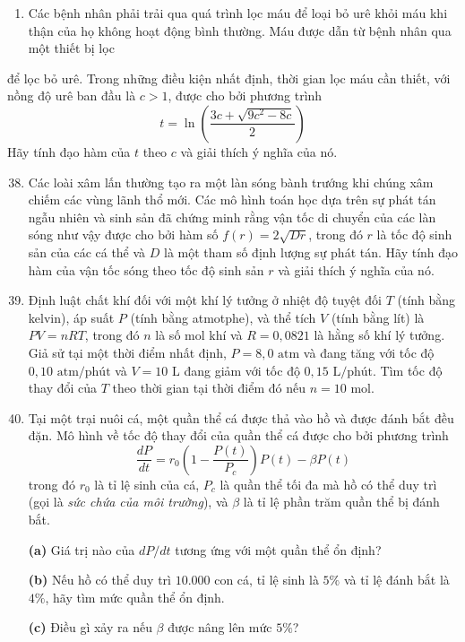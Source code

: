 \begin{minipage}[t]{0.485\textwidth}
\begin{enumerate}[label=\textbf{\arabic*.},leftmargin=1.6em,labelsep=0.4em,itemsep=6pt,topsep=5pt,parsep=1.5pt]
  \item Các bệnh nhân phải trải qua quá trình lọc máu để loại bỏ urê khỏi máu khi thận của họ không hoạt động bình thường. Máu được dẫn từ bệnh nhân qua một thiết bị lọc
\end{enumerate}
\end{minipage}%
\hfill
\begin{minipage}[t]{0.485\textwidth}
\vspace{0pt}
\noindent
để lọc bỏ urê. Trong những điều kiện nhất định, thời gian lọc máu cần thiết, với nồng độ urê ban đầu là $c > 1$, được cho bởi phương trình
\[
t = \ln\left( \frac{3c + \sqrt{9c^2 - 8c}}{2} \right)
\]
Hãy tính đạo hàm của $t$ theo $c$ và giải thích ý nghĩa của nó.

\begin{enumerate}[label=\textbf{\arabic*.},leftmargin=1.6em,labelsep=0.4em,itemsep=6pt,topsep=5pt,parsep=1.5pt]
\setcounter{enumi}{37}
  \item Các loài xâm lấn thường tạo ra một làn sóng bành trướng khi chúng xâm chiếm các vùng lãnh thổ mới. Các mô hình toán học dựa trên sự phát tán ngẫu nhiên và sinh sản đã chứng minh rằng vận tốc di chuyển của các làn sóng như vậy được cho bởi hàm số $f(r) = 2\sqrt{Dr}$, trong đó $r$ là tốc độ sinh sản của các cá thể và $D$ là một tham số định lượng sự phát tán. Hãy tính đạo hàm của vận tốc sóng theo tốc độ sinh sản $r$ và giải thích ý nghĩa của nó.

  \item Định luật chất khí đối với một khí lý tưởng ở nhiệt độ tuyệt đối $T$ (tính bằng kelvin), áp suất $P$ (tính bằng atmotphe), và thể tích $V$ (tính bằng lít) là $PV = nRT$, trong đó $n$ là số mol khí và $R = 0{,}0821$ là hằng số khí lý tưởng. Giả sử tại một thời điểm nhất định, $P = 8{,}0\text{ atm}$ và đang tăng với tốc độ $0{,}10\text{ atm/phút}$ và $V = 10\text{ L}$ đang giảm với tốc độ $0{,}15\text{ L/phút}$. Tìm tốc độ thay đổi của $T$ theo thời gian tại thời điểm đó nếu $n = 10\text{ mol}$.

  \item Tại một trại nuôi cá, một quần thể cá được thả vào hồ và được đánh bắt đều đặn. Mô hình về tốc độ thay đổi của quần thể cá được cho bởi phương trình
  \[
  \frac{dP}{dt} = r_0\left( 1 - \frac{P(t)}{P_c} \right)P(t) - \beta P(t)
  \]
  trong đó $r_0$ là tỉ lệ sinh của cá, $P_c$ là quần thể tối đa mà hồ có thể duy trì (gọi là \textit{sức chứa của môi trường}), và $\beta$ là tỉ lệ phần trăm quần thể bị đánh bắt.\par
  \textbf{(a)} Giá trị nào của $dP/dt$ tương ứng với một quần thể ổn định?\par
  \textbf{(b)} Nếu hồ có thể duy trì $10.000$ con cá, tỉ lệ sinh là $5\%$ và tỉ lệ đánh bắt là $4\%$, hãy tìm mức quần thể ổn định.\par
  \textbf{(c)} Điều gì xảy ra nếu $\beta$ được nâng lên mức $5\%$?


\end{enumerate}
\end{minipage}
